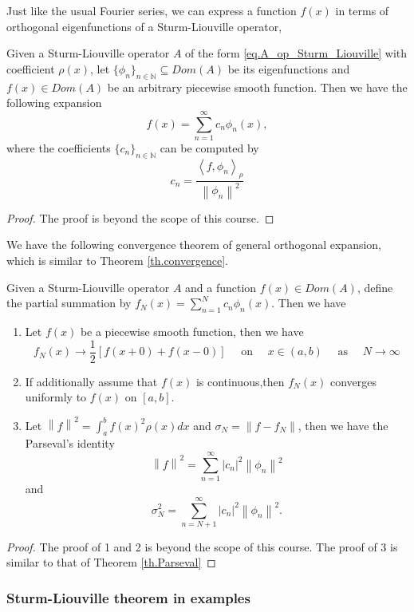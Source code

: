 Just like the usual Fourier series, we can express a function $f(x)$ in terms of orthogonal eigenfunctions of a Sturm-Liouville operator,
\begin{theorem}
    Given a Sturm-Liouville operator $A$ of the form \eqref{eq.A_op_Sturm_Liouville} with coefficient $\rho(x)$, let $\{\phi_n\}_{n\in \mathbb{N}}\subseteq \textit{Dom}(A)$ be its eigenfunctions and $f(x)\in \textit{Dom}(A)$ be an arbitrary piecewise smooth function. Then we have the following expansion
    \begin{equation}\label{eq.general_Fourier}
        f(x) =\sum_{n=1}^\infty c_n \phi_n(x),
    \end{equation}
    where the coefficients $\{c_n\}_{n\in \mathbb{N}}$ can be computed by
    \begin{equation}\label{eq.general_Fourier_coef}
        c_n=\frac{\left\langle f, \phi_n\right\rangle_\rho}{\left\|\phi_n\right\|^2}
    \end{equation}
\end{theorem}
\begin{proof}
    The proof is beyond the scope of this course. 
\end{proof}

We have the following convergence theorem of general orthogonal expansion, which is similar to Theorem \ref{th.convergence}.
\begin{theorem}[Convergence]
Given a Sturm-Liouville operator $A$ and a function $f(x)\in \textit{Dom}(A)$, define the partial summation by $f_N(x)=\sum_{n=1}^N c_n \phi_n(x)$. Then we have
\begin{enumerate}
    \item Let $f(x)$ be a piecewise smooth function, then we have 
    \begin{equation}
        f_N(x) \rightarrow \frac{1}{2}[f(x+0)+f(x-0)] \quad \text { on } \quad x \in(a, b) \quad \text { as } \quad N \rightarrow \infty
    \end{equation}
    \item If additionally assume that $f(x)$ is continuous,then $f_N(x)$ converges uniformly to $f(x)$ on $[a, b]$.    
    \item Let $\left\|f\right\|^2 = \int_a^b f(x)^2 \rho(x) d x$ and $\sigma_N = \left\|f - f_N\right\|$, then we have the Parseval's identity
    \begin{equation}\label{eq.Parseval_general}
        \left\|f\right\|^2 = \sum_{n=1}^\infty |c_n|^2\left\|\phi_n\right\|^2
    \end{equation}
    and
    \begin{equation}\label{eq.mean_square_error_Parseval_general}
        \sigma_N^2 = \sum_{n= N+1}^\infty |c_n|^2\left\|\phi_n\right\|^2.
    \end{equation}
\end{enumerate}
\end{theorem}
\begin{proof}
    The proof of 1 and 2 is beyond the scope of this course. The proof of 3 is similar to that of Theorem \ref{th.Parseval}
\end{proof}

\subsubsection{Sturm-Liouville theorem in examples}
